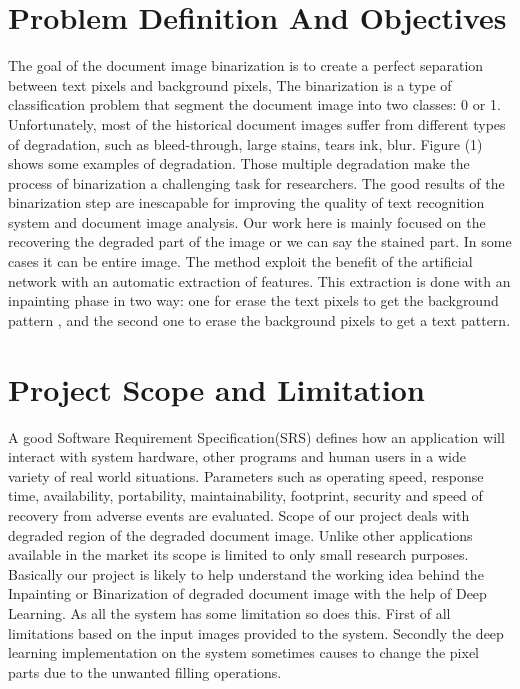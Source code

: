 \documentclass[oneside,a4paper,12pt]{report}
\begin{document}
\section{Problem Definition And Objectives}
The goal of the document image binarization is to create a
perfect separation between text pixels and background pixels,
The binarization is a type of classification problem that segment the document image into two classes: 0 or 1.\\
Unfortunately, most of the historical document images suffer
from different types of degradation, such as bleed-through,
large stains, tears ink, blur. Figure (1) shows some examples
of degradation. Those multiple degradation make the process
of binarization a challenging task for researchers.
The good results of the binarization step are inescapable for
improving the quality of text recognition system and document
image analysis.
Our work here is mainly focused on the recovering the degraded part of the image or we can say the stained part. In some cases it can be entire image. The method exploit the benefit of the artificial network with an automatic extraction of features. This extraction is done with an inpainting phase in two way: one for erase the text pixels to get the background pattern , and the second one to erase the background pixels to get a text pattern.

\section{Project Scope and Limitation}
A good Software Requirement Specification(SRS) defines how an application will interact with system hardware, other programs and human users in a wide variety of real world situations. Parameters such as operating speed, response time, availability, portability, maintainability, footprint, security and speed of recovery from adverse events are evaluated.
Scope of our project deals with degraded region of the degraded document image. Unlike other applications available in the market
its scope is limited to only small research purposes. Basically our project is likely to help understand the working idea behind the Inpainting or Binarization of degraded document image with the help of Deep Learning.
As all the system has some limitation so does this. First of all
limitations based on the input images provided to the system.
Secondly the deep learning implementation on the system sometimes causes to change the pixel parts due to the unwanted filling operations.
\end{document}
